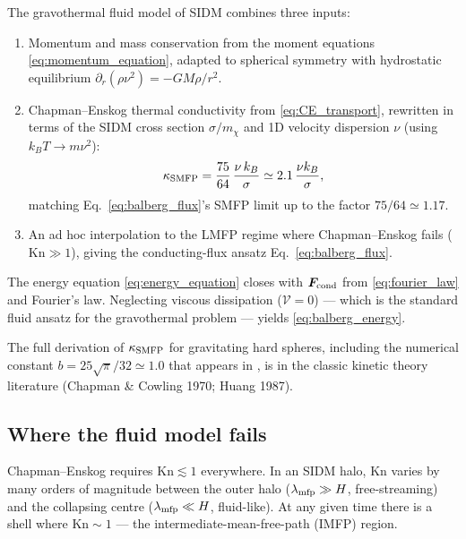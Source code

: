\documentclass[12pt]{article}
\renewcommand{\vec}[1]{\bm{#1}}
\newcommand{\smx}{\sigma/m_\chi}
\begin{document}
The \citet{Balberg2002} gravothermal fluid model of SIDM combines
three inputs:
%
\begin{enumerate}
  \item Momentum and mass conservation from the moment equations
        \eqref{eq:momentum_equation}, adapted to spherical symmetry
        with hydrostatic equilibrium
        $\partial_r(\rho\nu^2) = -GM\rho/r^2$.
  \item Chapman--Enskog thermal conductivity from
        \eqref{eq:CE_transport}, rewritten in terms of the SIDM
        cross section $\smx$ and 1D velocity dispersion $\nu$
        (using $k_B T \to m\nu^2$):
        \begin{equation}
          \kappa_{\rm SMFP}
            = \frac{75}{64}\,\frac{\nu\,k_B}{\sigma}
            \simeq 2.1\,\frac{\nu k_B}{\sigma},
          \label{eq:kappa_smfp}
        \end{equation}
        matching Eq.~\eqref{eq:balberg_flux}'s SMFP limit up to the
        factor $75/64\simeq 1.17$.
  \item An ad hoc interpolation to the LMFP regime where
        Chapman--Enskog fails ($\mathrm{Kn}\gg 1$), giving the
        conducting-flux ansatz Eq.~\eqref{eq:balberg_flux}.
\end{enumerate}
%
The energy equation \eqref{eq:energy_equation} closes with
$\vec F_{\rm cond}$ from \eqref{eq:fourier_law} and Fourier's law.
Neglecting viscous dissipation ($\mathcal V = 0$) --- which is the
standard fluid ansatz for the gravothermal problem --- yields
\eqref{eq:balberg_energy}.

The full derivation of $\kappa_{\rm SMFP}$ for gravitating hard
spheres, including the numerical constant $b = 25\sqrt\pi/32\simeq
1.0$ that appears in \citet{Balberg2002}, is in the classic kinetic
theory literature (Chapman \& Cowling 1970; Huang 1987).

\subsection{Where the fluid model fails}
\label{app:CE_breakdown}

Chapman--Enskog requires $\mathrm{Kn}\lesssim 1$ everywhere.  In an
SIDM halo, $\mathrm{Kn}$ varies by many orders of magnitude between
the outer halo ($\lambda_{\rm mfp}\gg H$, free-streaming) and the
collapsing centre ($\lambda_{\rm mfp}\ll H$, fluid-like).  At any
given time there is a shell where $\mathrm{Kn}\sim 1$ --- the
intermediate-mean-free-path (IMFP) region.
\end{document}
